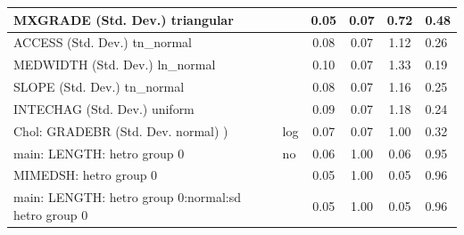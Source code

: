 \begin{table}
\begin{center}
\begin{tabular}{|l|l|c|c|c|l|}
			\hline
			MXGRADE (Std. Dev.) triangular &  & 0.05 & 0.07 & 0.72 & 0.48 \\
			\hline
			ACCESS (Std. Dev.) tn_normal &  & 0.08 & 0.07 & 1.12 & 0.26 \\
			\hline
			MEDWIDTH (Std. Dev.) ln_normal &  & 0.10 & 0.07 & 1.33 & 0.19 \\
			\hline
			SLOPE (Std. Dev.) tn_normal &  & 0.08 & 0.07 & 1.16 & 0.25 \\
			\hline
			INTECHAG (Std. Dev.) uniform &  & 0.09 & 0.07 & 1.18 & 0.24 \\
			\hline
			 Chol: GRADEBR (Std. Dev. normal) ) & log & 0.07 & 0.07 & 1.00 & 0.32 \\
			\hline
			main: LENGTH: hetro group 0 & no & 0.06 & 1.00 & 0.06 & 0.95 \\
			\hline
			MIMEDSH: hetro group 0 &  & 0.05 & 1.00 & 0.05 & 0.96 \\
			\hline
			main: LENGTH: hetro group 0:normal:sd  hetro group 0 &  & 0.05 & 1.00 & 0.05 & 0.96 \\
			\hline
		\end{tabular}
	\end{center}
\end{table}